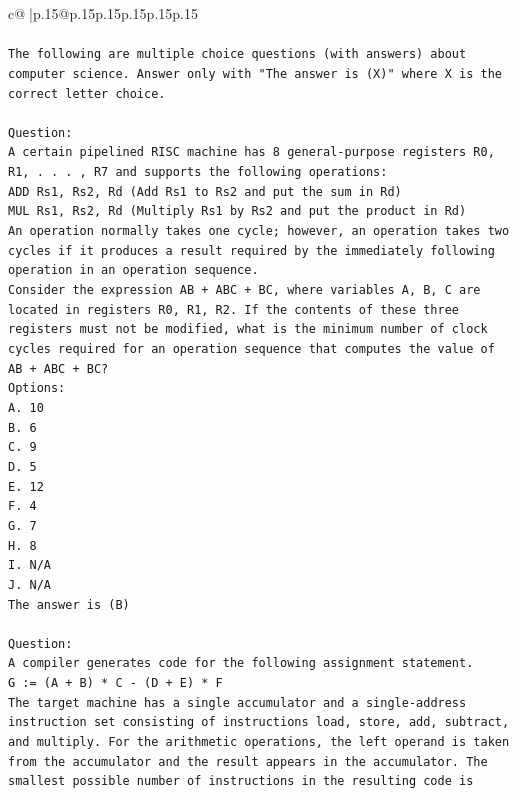 \documentclass{article}
\begin{document}
{\begin{supertabular}{c@{$\;$}|p{.15\linewidth}@{}p{.15\linewidth}p{.15\linewidth}p{.15\linewidth}p{.15\linewidth}p{.15\linewidth}}
{{{\\ 
\\ 
\texttt{The following are multiple choice questions (with answers) about computer science. Answer only with "The answer is (X)" where X is the correct letter choice.} \\
\\ 
\texttt{Question:} \\
\texttt{A certain pipelined RISC machine has 8 general{-}purpose registers R0, R1, . . . , R7 and supports the following operations:} \\
\texttt{ADD Rs1, Rs2, Rd (Add Rs1 to Rs2 and put the sum in Rd)} \\
\texttt{MUL Rs1, Rs2, Rd (Multiply Rs1 by Rs2 and put the product in Rd)} \\
\texttt{An operation normally takes one cycle; however, an operation takes two cycles if it produces a result required by the immediately following operation in an operation sequence.} \\
\texttt{Consider the expression AB + ABC + BC, where variables A, B, C are located in registers R0, R1, R2. If the contents of these three registers must not be modified, what is the minimum number of clock cycles required for an operation sequence that computes the value of AB + ABC + BC?} \\
\texttt{Options:} \\
\texttt{A. 10} \\
\texttt{B. 6} \\
\texttt{C. 9} \\
\texttt{D. 5} \\
\texttt{E. 12} \\
\texttt{F. 4} \\
\texttt{G. 7} \\
\texttt{H. 8} \\
\texttt{I. N/A} \\
\texttt{J. N/A} \\
\texttt{The answer is (B)} \\
\\ 
\texttt{Question:} \\
\texttt{A compiler generates code for the following assignment statement.} \\
\texttt{G := (A + B) * C {-} (D + E) * F} \\
\texttt{The target machine has a single accumulator and a single{-}address instruction set consisting of instructions load, store, add, subtract, and multiply. For the arithmetic operations, the left operand is taken from the accumulator and the result appears in the accumulator. The smallest possible number of instructions in the resulting code is} \\
}}}
\end{supertabular}}
\end{document}
